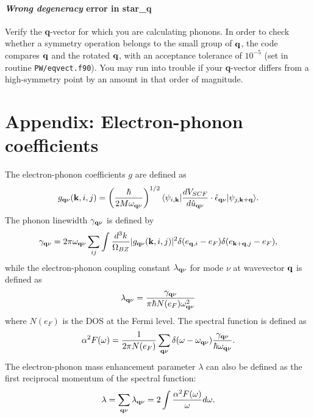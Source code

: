 \documentclass[12pt,a4paper]{article}
\begin{document}
\paragraph{{\em Wrong degeneracy} error in star\_q}
Verify the {\bf q}-vector for which you are calculating phonons. In order to
check whether a symmetry operation belongs to the small group of ${\bf q}$,
the code compares ${\bf q}$ and the rotated ${\bf q}$, with an acceptance tolerance of  
$10^{-5}$ (set in routine \texttt{PW/eqvect.f90}). You may run into trouble if
your {\bf q}-vector differs from a high-symmetry point by an amount in that
order of magnitude.

\appendix
\section{Appendix: Electron-phonon coefficients}

\def\r{{\bf r}}
\def\d{{\bf d}}
\def\k{{\bf k}}
\def\q{{\bf q}}
\def\G{{\bf G}}
\def\R{{\bf R}}

\noindent The electron-phonon coefficients $g$
are defined as
\begin{equation}
g_{\q\nu}(\k,i,j) =\left({\hbar\over 2M\omega_{\q\nu}}\right)^{1/2}
\langle\psi_{i,\k}| {dV_{SCF}\over d {\hat u}_{\q\nu} }\cdot
                   \hat \epsilon_{\q\nu}|\psi_{j,\k+\q}\rangle.
\end{equation}
The phonon linewidth $\gamma_{\q\nu}$ is defined by
\begin{equation}
\gamma_{\q\nu} = 2\pi\omega_{\q\nu} \sum_{ij}
                \int {d^3k\over \Omega_{BZ}}  |g_{\q\nu}(\k,i,j)|^2
                    \delta(e_{\q,i} - e_F)  \delta(e_{\k+\q,j} - e_F), 
\end{equation}
while the electron-phonon coupling constant $\lambda_{\q\nu}$ for
mode $\nu$ at wavevector $\q$ is defined as
\begin{equation}
\lambda_{\q\nu} ={\gamma_{\q\nu} \over \pi\hbar N(e_F)\omega^2_{\q\nu}}
\end{equation}
where $N(e_F)$ is the DOS at the Fermi level.
The spectral function is defined as
\begin{equation}
\alpha^2F(\omega) = {1\over 2\pi N(e_F)}\sum_{\q\nu} 
                    \delta(\omega-\omega_{\q\nu})
                    {\gamma_{\q\nu}\over\hbar\omega_{\q\nu}}.
\end{equation}
The electron-phonon mass enhancement parameter $\lambda$
can also be defined as the first reciprocal momentum of 
the spectral function:
\begin{equation}
\lambda = \sum_{\q\nu} \lambda_{\q\nu} = 
2 \int {\alpha^2F(\omega) \over \omega} d\omega.
\end{equation}
\end{document}
